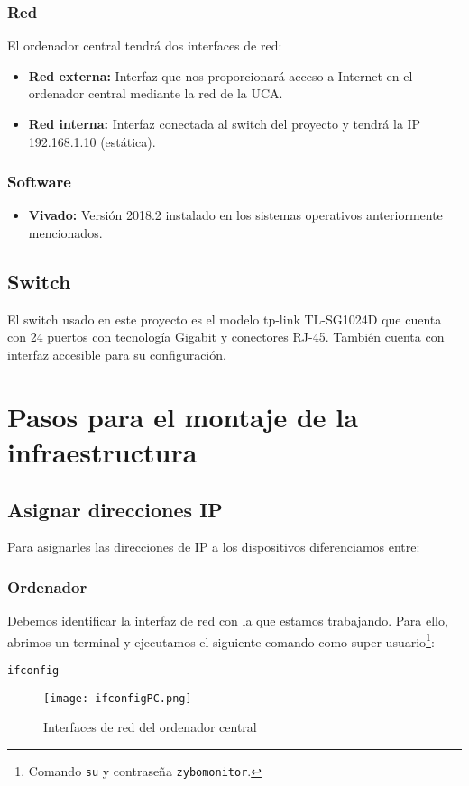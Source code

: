 \documentclass[12pt,letterpaper]{article}
\begin{document}
\subsubsection{Red}
El ordenador central tendrá dos interfaces de red:
\begin{itemize}
	\item \textbf{Red externa:} Interfaz que nos proporcionará acceso a Internet en el ordenador central mediante la red de la UCA.
	\item \textbf{Red interna:} Interfaz conectada al switch del proyecto y tendrá la IP 192.168.1.10 (estática).
\end{itemize}

\subsubsection{Software}
\begin{itemize}
	\item \textbf{Vivado:} Versión 2018.2 instalado en los sistemas operativos anteriormente mencionados.
\end{itemize}

\subsection{Switch}
El switch usado en este proyecto es el modelo tp-link TL-SG1024D que cuenta con 24 puertos con tecnología Gigabit y conectores RJ-45. También cuenta con interfaz accesible para su configuración.


\section{Pasos para el montaje de la infraestructura}
\subsection{Asignar direcciones IP}
Para asignarles las direcciones de IP a los dispositivos diferenciamos entre:
\subsubsection{Ordenador}
Debemos identificar la interfaz de red con la que estamos trabajando. Para ello, abrimos un terminal y ejecutamos el siguiente comando como super-usuario\footnote{Comando \texttt{su} y contraseña \texttt{zybomonitor}.}:
\begin{center}
	\texttt{ifconfig}
\end{center}
\newpage
\begin{figure}[h]
	\centering
	\texttt{[image: ifconfigPC.png]}
	\caption{Interfaces de red del ordenador central}
	\label{Interfaces de red del ordenador central}
\end{figure}
\end{document}
